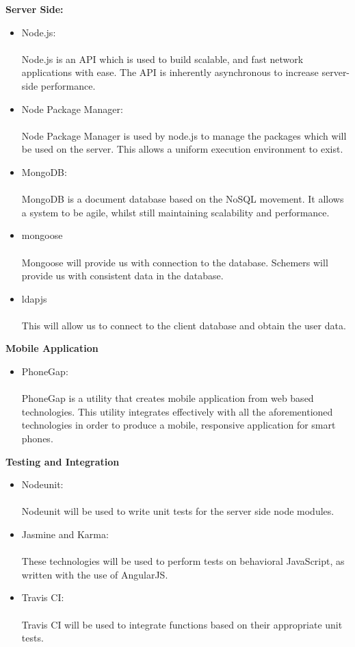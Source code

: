{\bfseries Server Side:}
\begin{itemize}
	\item Node.js:\\ \\ 
	Node.js is an API which is used to build scalable, and fast network applications with ease. The API is inherently asynchronous to increase server-side performance.
	\item Node Package Manager:\\ \\
	Node Package Manager is used by node.js to manage the packages which will be used on the server. This allows a uniform execution environment to exist.
	\item MongoDB: \\ \\
	MongoDB is a document database based on the NoSQL movement. It allows a system to be agile, whilst still maintaining scalability and performance.
	\item mongoose \\ \\
	Mongoose will provide us with connection to the database. Schemers will provide us with consistent data in the database.
	\item ldapjs \\ \\
	This will allow us to connect to the client database and obtain the user data.
\end{itemize}
{\bfseries Mobile Application}
\begin{itemize}
	\item PhoneGap:\\ \\
	PhoneGap is a utility that creates mobile application from web based technologies. This utility integrates effectively with all the aforementioned technologies in order to produce a mobile, responsive application for smart phones.
\end{itemize}
{\bfseries Testing and Integration}
\begin{itemize}
	\item Nodeunit:\\ \\
	Nodeunit will be used to write unit tests for the server side node modules.
	\item Jasmine and Karma:\\ \\
	These technologies will be used to perform tests on behavioral JavaScript, as written with the use of AngularJS.
	\item Travis CI:\\ \\
	Travis CI will be used to integrate functions based on their appropriate unit tests.
\end{itemize}
